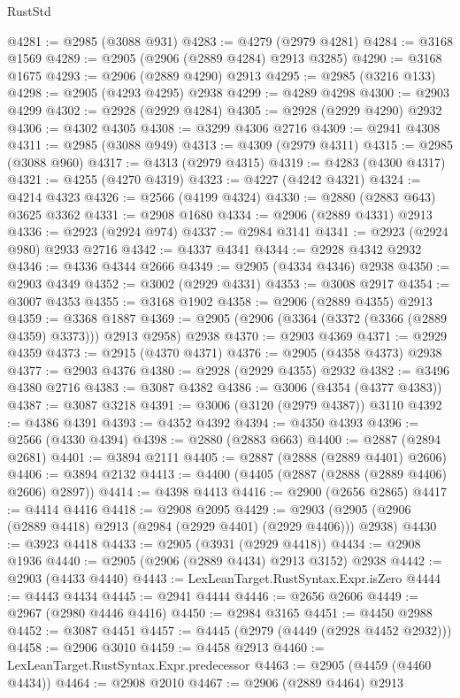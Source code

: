 \begin{lexlean}{RustStd}
\begin{coremodule}
@4281 := @2985 (@3088 @931)
@4283 := @4279 (@2979 @4281)
@4284 := @3168 @1569
@4289 := @2905 (@2906 (@2889 @4284) @2913 @3285)
@4290 := @3168 @1675
@4293 := @2906 (@2889 @4290) @2913
@4295 := @2985 (@3216 @133)
@4298 := @2905 (@4293 @4295) @2938
@4299 := @4289 @4298
@4300 := @2903 @4299
@4302 := @2928 (@2929 @4284)
@4305 := @2928 (@2929 @4290) @2932
@4306 := @4302 @4305
@4308 := @3299 @4306 @2716
@4309 := @2941 @4308
@4311 := @2985 (@3088 @949)
@4313 := @4309 (@2979 @4311)
@4315 := @2985 (@3088 @960)
@4317 := @4313 (@2979 @4315)
@4319 := @4283 (@4300 @4317)
@4321 := @4255 (@4270 @4319)
@4323 := @4227 (@4242 @4321)
@4324 := @4214 @4323
@4326 := @2566 (@4199 @4324)
@4330 := @2880 (@2883 @643) @3625 @3362
@4331 := @2908 @1680
@4334 := @2906 (@2889 @4331) @2913
@4336 := @2923 (@2924 @974)
@4337 := @2984 @3141
@4341 := @2923 (@2924 @980) @2933 @2716
@4342 := @4337 @4341
@4344 := @2928 @4342 @2932
@4346 := @4336 @4344 @2666
@4349 := @2905 (@4334 @4346) @2938
@4350 := @2903 @4349
@4352 := @3002 (@2929 @4331)
@4353 := @3008 @2917
@4354 := @3007 @4353
@4355 := @3168 @1902
@4358 := @2906 (@2889 @4355) @2913
@4359 := @3368 @1887
@4369 := @2905 (@2906 (@3364 (@3372 (@3366 (@2889 @4359) @3373))) @2913 @2958) @2938
@4370 := @2903 @4369
@4371 := @2929 @4359
@4373 := @2915 (@4370 @4371)
@4376 := @2905 (@4358 @4373) @2938
@4377 := @2903 @4376
@4380 := @2928 (@2929 @4355) @2932
@4382 := @3496 @4380 @2716
@4383 := @3087 @4382
@4386 := @3006 (@4354 (@4377 @4383))
@4387 := @3087 @3218
@4391 := @3006 (@3120 (@2979 @4387)) @3110
@4392 := @4386 @4391
@4393 := @4352 @4392
@4394 := @4350 @4393
@4396 := @2566 (@4330 @4394)
@4398 := @2880 (@2883 @663)
@4400 := @2887 (@2894 @2681)
@4401 := @3894 @2111
@4405 := @2887 (@2888 (@2889 @4401) @2606)
@4406 := @3894 @2132
@4413 := @4400 (@4405 (@2887 (@2888 (@2889 @4406) @2606) @2897))
@4414 := @4398 @4413
@4416 := @2900 (@2656 @2865)
@4417 := @4414 @4416
@4418 := @2908 @2095
@4429 := @2903 (@2905 (@2906 (@2889 @4418) @2913 (@2984 (@2929 @4401) (@2929 @4406))) @2938)
@4430 := @3923 @4418
@4433 := @2905 (@3931 (@2929 @4418))
@4434 := @2908 @1936
@4440 := @2905 (@2906 (@2889 @4434) @2913 @3152) @2938
@4442 := @2903 (@4433 @4440)
@4443 := LexLeanTarget.RustSyntax.Expr.isZero
@4444 := @4443 @4434
@4445 := @2941 @4444
@4446 := @2656 @2606
@4449 := @2967 (@2980 @4446 @4416)
@4450 := @2984 @3165
@4451 := @4450 @2988
@4452 := @3087 @4451
@4457 := @4445 (@2979 (@4449 (@2928 @4452 @2932)))
@4458 := @2906 @3010
@4459 := @4458 @2913
@4460 := LexLeanTarget.RustSyntax.Expr.predecessor
@4463 := @2905 (@4459 (@4460 @4434))
@4464 := @2908 @2010
@4467 := @2906 (@2889 @4464) @2913

\end{coremodule}
\end{lexlean}
